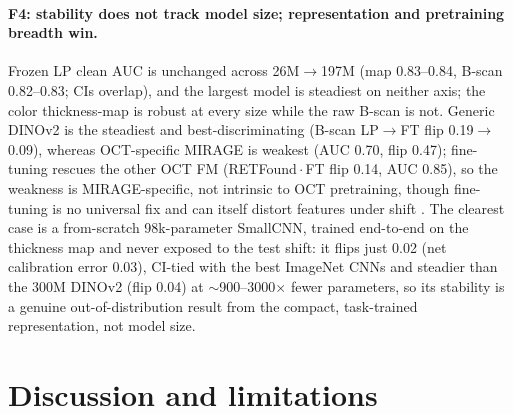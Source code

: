 \paragraph{F4: stability does not track model size; representation and pretraining breadth win.}
Frozen LP clean AUC is unchanged across 26M$\rightarrow$197M (map \num{0.83}--\num{0.84}, B-scan
\num{0.82}--\num{0.83}; CIs overlap), and the largest model is steadiest on neither axis; the color thickness-map is
robust at every size while the raw B-scan is not. Generic DINOv2 is the steadiest and best-discriminating (B-scan
LP$\rightarrow$FT flip \num{0.19}$\rightarrow$\num{0.09}), whereas OCT-specific MIRAGE is weakest (AUC \num{0.70}, flip
\num{0.47}); fine-tuning rescues the other OCT FM (RETFound\,$\cdot$\,FT flip \num{0.14}, AUC \num{0.85}), so the
weakness is MIRAGE-specific, not intrinsic to OCT pretraining, though fine-tuning is no universal fix and can itself
distort features under shift \citep{kumar2022finetuning}. The clearest case is a from-scratch 98k-parameter SmallCNN, trained
end-to-end on the thickness map and never exposed to the test shift: it flips just \num{0.02}  (net
calibration error \num{0.03}), CI-tied with the best ImageNet CNNs and steadier than the 300M DINOv2 (flip
\num{0.04}) at $\sim$900--3000$\times$ fewer parameters, so its stability is a genuine out-of-distribution result
from the compact, task-trained representation, not model size.

\section{Discussion and limitations}
\label{sec:discussion}

